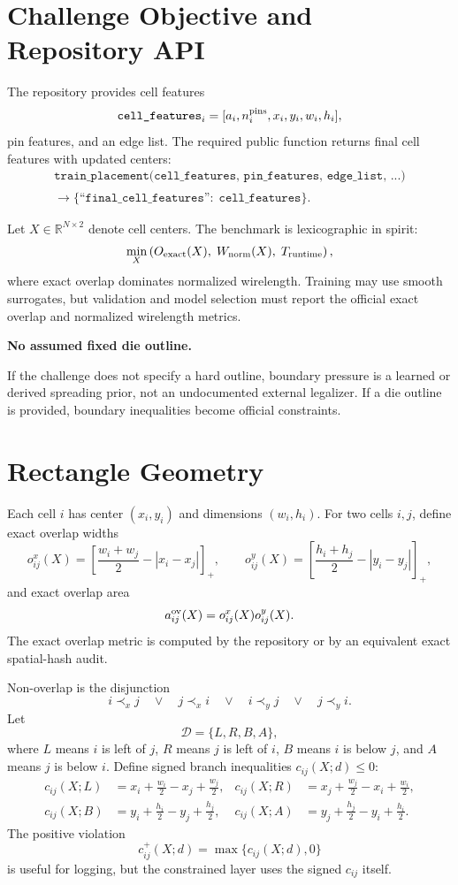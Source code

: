 \documentclass[11pt]{article}
\newcommand{\R}{\mathbb{R}}
\newcommand{\Branch}{\mathcal{D}}
\newcommand{\ExactOv}{O_{\rm exact}}
\newcommand{\WireNorm}{W_{\rm norm}}
\newcommand{\callout}[3]{%
\medskip\noindent\textbf{\textcolor{#1}{#2.}}\par\noindent #3\par\medskip
}
\begin{document}
\section{Challenge Objective and Repository API}

The repository provides cell features
\[
    \texttt{cell\_features}_i
    = [a_i,n_i^{\rm pins},x_i,y_i,w_i,h_i],
\]
pin features, and an edge list. The required public function returns final cell features with updated centers:
\[
\begin{gathered}
    \texttt{train\_placement(cell\_features, pin\_features, edge\_list, ...)}\\
    \longrightarrow
    \{\texttt{``final\_cell\_features''}:\;\widehat{\texttt{cell\_features}}\}.
\end{gathered}
\]

Let $X\in\R^{N\times 2}$ denote cell centers. The benchmark is lexicographic in spirit:
\[
    \min_X \left(\ExactOv(X),\;\WireNorm(X),\;T_{\rm runtime}\right),
\]
where exact overlap dominates normalized wirelength. Training may use smooth surrogates, but validation and model selection must report the official exact overlap and normalized wirelength metrics.

\callout{blue!70!black}{No assumed fixed die outline}{If the challenge does not specify a hard outline, boundary pressure is a learned or derived spreading prior, not an undocumented external legalizer. If a die outline is provided, boundary inequalities become official constraints.}

\section{Rectangle Geometry}

Each cell $i$ has center $(x_i,y_i)$ and dimensions $(w_i,h_i)$. For two cells $i,j$, define exact overlap widths
\[
    o^x_{ij}(X)=\left[\frac{w_i+w_j}{2}-|x_i-x_j|\right]_+,
    \qquad
    o^y_{ij}(X)=\left[\frac{h_i+h_j}{2}-|y_i-y_j|\right]_+,
\]
and exact overlap area
\[
    a^{\rm ov}_{ij}(X)=o^x_{ij}(X)o^y_{ij}(X).
\]
The exact overlap metric is computed by the repository or by an equivalent exact spatial-hash audit.

Non-overlap is the disjunction
\[
    i\prec_x j
    \quad\vee\quad
    j\prec_x i
    \quad\vee\quad
    i\prec_y j
    \quad\vee\quad
    j\prec_y i.
\]
Let
\[
    \Branch=\{L,R,B,A\},
\]
where $L$ means $i$ is left of $j$, $R$ means $j$ is left of $i$, $B$ means $i$ is below $j$, and $A$ means $j$ is below $i$. Define signed branch inequalities $c_{ij}(X;d)\le0$:
\[
\begin{aligned}
    c_{ij}(X;L) &= x_i+\frac{w_i}{2}-x_j+\frac{w_j}{2},
    &c_{ij}(X;R) &= x_j+\frac{w_j}{2}-x_i+\frac{w_i}{2},\\
    c_{ij}(X;B) &= y_i+\frac{h_i}{2}-y_j+\frac{h_j}{2},
    &c_{ij}(X;A) &= y_j+\frac{h_j}{2}-y_i+\frac{h_i}{2}.
\end{aligned}
\]
The positive violation
\[
    c^+_{ij}(X;d)=\max\{c_{ij}(X;d),0\}
\]
is useful for logging, but the constrained layer uses the signed $c_{ij}$ itself.
\end{document}
